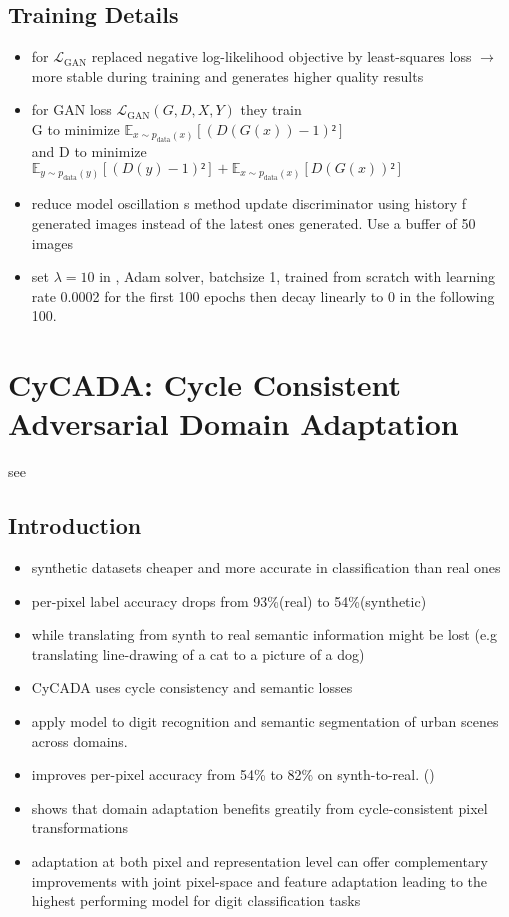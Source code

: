 \subsection{Training Details}
\begin{itemize}
	\item for $\mathcal{L}_{\text{GAN}}$ replaced negative log-likelihood objective by least-squares loss $\rightarrow$ more stable during training and generates higher quality results
	\item for GAN loss $\mathcal{L}_{\text{GAN}}(G, D, X, Y)$ they train \\
	G to minimize $\mathbb{E}_{x\sim p_{\text{data}}(x)}[(D(G(x)) - 1)²]$ \\
	and D to minimize $\mathbb{E}_{y\sim p_{\text{data}}(y)}[(D(y)-1)²] + \mathbb{E}_{x\sim p_{\text{data}}(x)}[D(G(x))²]$
	\item reduce model oscillation s method update discriminator using history f generated images instead of the latest ones generated. Use a buffer of 50 images
	\item set $\lambda = 10$ in , Adam solver, batchsize 1, trained from scratch with learning rate 0.0002 for the first 100 epochs then decay linearly to 0 in the following 100. 
\end{itemize}


\newpage

\section{CyCADA: Cycle Consistent Adversarial Domain Adaptation}

see \cite{DBLP:journals/corr/abs-1711-03213}

\subsection{Introduction}
\begin{itemize}
	\item synthetic datasets cheaper and more accurate in classification than real ones
	\item per-pixel label accuracy drops from 93\%(real) to 54\%(synthetic)
	\item while translating from synth to real semantic information might be lost (e.g translating line-drawing of a cat to a picture of a dog)
	\item CyCADA uses cycle consistency and semantic losses
	\item apply model to digit recognition and semantic segmentation of urban scenes across domains. 
	\item improves per-pixel accuracy from 54\% to 82\% on synth-to-real. ()
	\item shows that domain adaptation benefits greatily from cycle-consistent pixel transformations
	\item adaptation at both pixel and representation level can offer complementary improvements with joint pixel-space and feature adaptation leading to the highest performing model for digit classification tasks
\end{itemize}

